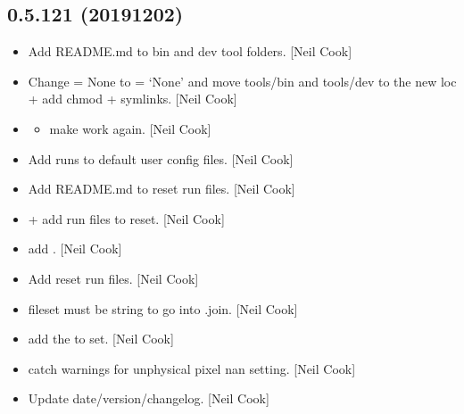 \documentclass[a4paper,10pt,english]{report}
\begin{document}
\subsection{0.5.121 (2019\sphinxhyphen{}12\sphinxhyphen{}02)}
\label{\detokenize{misc/changelog:id41}}\begin{itemize}
\item {} 
Add README.md to bin and dev tool folders. {[}Neil Cook{]}

\item {} 
Change  = None to  = ‘None’ and move
tools/bin and tools/dev to the new loc + add chmod + symlinks. {[}Neil
Cook{]}

\item {} \begin{itemize}
\item {} 
make  work again. {[}Neil Cook{]}

\end{itemize}

\item {} 
Add runs to default user config files. {[}Neil Cook{]}

\item {} 
Add README.md to reset run files. {[}Neil Cook{]}

\item {} 
 +  \sphinxhyphen{} add run files to reset. {[}Neil
Cook{]}

\item {} 
 \sphinxhyphen{} add . {[}Neil
Cook{]}

\item {} 
Add reset run files. {[}Neil Cook{]}

\item {} 
 \sphinxhyphen{} fileset must be string to go
into .join. {[}Neil Cook{]}

\item {} 
 \sphinxhyphen{} add the  to
 set. {[}Neil Cook{]}

\item {} 
 \sphinxhyphen{} catch warnings for unphysical pixel nan
setting. {[}Neil Cook{]}

\item {} 
Update date/version/changelog. {[}Neil Cook{]}

\end{itemize}
\end{document}
